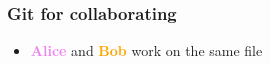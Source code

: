 \documentclass[xcolor=x11names,compress]{beamer}
\renewcommand{\(}{\begin{columns}}
\renewcommand{\)}{\end{columns}}
\newcommand{\<}[1]{\begin{column}{#1}}
\renewcommand{\>}{\end{column}}
\begin{document}
\begin{frame}
\frametitle{Git for collaborating}
\begin{itemize}
\item[] \textcolor{violet}{\textbf{Alice}} and \textcolor{orange}{\textbf{Bob}} work on the same file\\ \vspace{1cm}

\end{itemize}
\end{frame}
\end{document}
